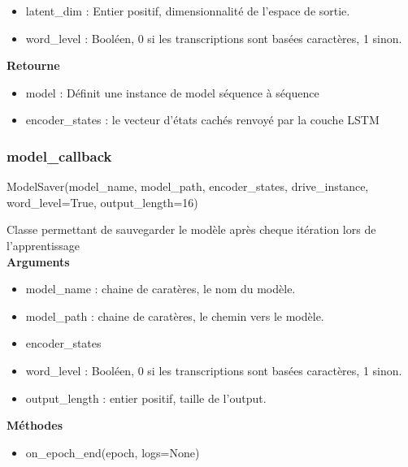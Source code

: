 \begin{enumerate}
\begin{itemize}
                \item latent\_dim : Entier positif, dimensionnalité de l'espace de sortie.
                \item word\_level : Booléen, 0 si les transcriptions sont basées caractères, 1 sinon.
            \end{itemize}
            \textbf{Retourne} 
            \begin{itemize}
                \item model : Définit une instance de model séquence à séquence 
                \item encoder\_states : le vecteur d'états cachés renvoyé par la couche LSTM
            \end{itemize}
    \end{enumerate}
    
    
    \subsubsection{model\_callback}
    \begin{tcolorbox}
    ModelSaver(model\_name, model\_path, encoder\_states, drive\_instance, word\_level=True, output\_length=16)
    \end{tcolorbox}
    Classe permettant de sauvegarder le modèle après cheque itération lors de l'apprentissage \\
    \textbf{Arguments} 
    \begin{itemize}
        \item model\_name : chaine de caratères, le nom du modèle.
        \item model\_path : chaine de caratères, le chemin vers le modèle.
        \item encoder\_states
        \item word\_level : Booléen, 0 si les transcriptions sont basées caractères, 1 sinon.
        \item output\_length : entier positif, taille de l'output.
    \end{itemize}
    \textbf{Méthodes}
    \begin{itemize}
        \item on\_epoch\_end(epoch, logs=None)
    \end{itemize}
    
